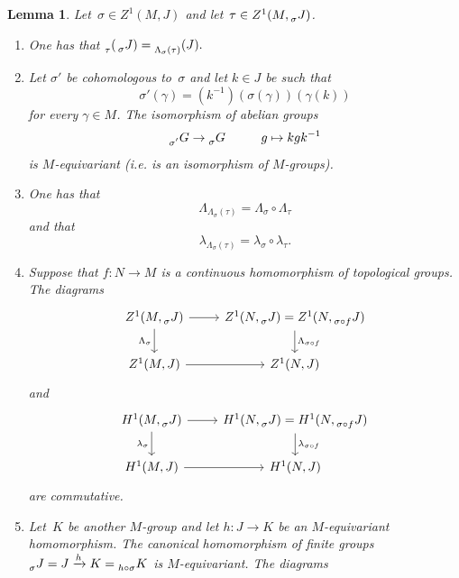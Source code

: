 \documentclass[a4paper,english,12pt]{amsart}
\newcommand{\sJ}{\prescript{}{\sigma}J}
\newtheorem{lem}[equation]{Lemma}
\numberwithin{equation}{subsection}
\begin{document}
\begin{lem}\label{listproptwist} Let~$\sigma\in Z^1(M,J)$ and let~$\tau\in Z^1(M,\prescript{}{\sigma}J)$.
\begin{enumerate}
\item One has that $\prescript{}{\tau}(\prescript{}{\sigma}J)=\prescript{}{\Lambda_{\sigma}(\tau)}(J).$
\item Let $\sigma'$ be cohomologous to~$\sigma$ and let $k\in J$ be such that $$\sigma'(\gamma)=(k^{-1})(\sigma(\gamma))(\gamma(k))$$ for every $\gamma\in M$. The isomorphism of abelian groups $$\prescript{}{\sigma'}G\to\prescript{}{\sigma} G\hspace{1cm}g\mapsto kgk^{-1}$$is $M$-equivariant (i.e. is an isomorphism of $M$-groups).
\item One has that $$ \Lambda_{\Lambda_{\sigma}(\tau)}=\Lambda_{\sigma}\circ\Lambda_{\tau}$$ and that  $$ \lambda_{\Lambda_{\sigma}(\tau)}=\lambda_{\sigma}\circ\lambda_{\tau}.$$
\item Suppose that $f:N\to M$ is a continuous homomorphism of topological groups. The diagrams  %
\[\begin{tikzcd}
	{Z^1(M, \sJ)} & {Z^1(N,\sJ)=Z^1(N, \prescript{}{\sigma\circ f}J)} \\
	{Z^1(M, J)} & {Z^1(N, J)}
	\arrow[from=1-1, to=1-2]
	\arrow["{\Lambda_{\sigma}}"', from=1-1, to=2-1]
	\arrow["{}"', from=2-1, to=2-2]
	\arrow["{\Lambda_{\sigma\circ f}}", from=1-2, to=2-2]
\end{tikzcd}\]
and 
\[\begin{tikzcd}
	{H^1(M, \sJ)} & {H^1(N,\sJ)=H^1(N, \prescript{}{\sigma\circ f}J)} \\
	{H^1(M, J)} & {H^1(N, J)}
	\arrow[from=1-1, to=1-2]
	\arrow["{\lambda_{\sigma}}"', from=1-1, to=2-1]
	\arrow["{}"', from=2-1, to=2-2]
	\arrow["{\lambda_{\sigma\circ f}}", from=1-2, to=2-2]
\end{tikzcd}\]
are commutative.
\item Let~$K$ be another $M$-group and let $h:J\to K$ be an $M$-equivariant homomorphism. The canonical homomorphism of finite groups $\sJ=J\xrightarrow{h} K=\prescript{}{h\circ\sigma}K$ is $M$-equivariant. The diagrams

\end{enumerate}
\end{lem}
\end{document}
